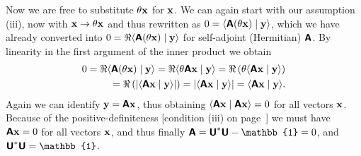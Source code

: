 {Now we are free to substitute  $\theta   {\bf x}$ for ${\bf x}$.
We can again start with our assumption (iii), now with  ${\bf x} \rightarrow \theta   {\bf x}$ and thus
rewritten as $0 =
\langle \textsf{\textbf{A}} (\theta   {\bf x}) \mid {\bf y} \rangle $, which we have already converted into
$0
=\Re  \langle \textsf{\textbf{A}} (\theta    {\bf x}) \mid {\bf y} \rangle$
for self-adjoint (Hermitian) $\textsf{\textbf{A}}$.
By linearity in the first argument of the inner product we obtain
\begin{equation}
\begin{split}
0
=\Re  \langle \textsf{\textbf{A}} (\theta    {\bf x}) \mid {\bf y} \rangle
=\Re  \langle  \theta  \textsf{\textbf{A}}   {\bf x}  \mid {\bf y} \rangle
=\Re   \left( \theta   \langle \textsf{\textbf{A}}   {\bf x} \mid {\bf y} \rangle      \right)  \\
=\Re \left( \vert \langle \textsf{\textbf{A}}   {\bf x} \mid {\bf y} \rangle    \vert  \right)
=  \vert \langle \textsf{\textbf{A}}   {\bf x} \mid {\bf y} \rangle    \vert
=   \langle \textsf{\textbf{A}}   {\bf x} \mid {\bf y} \rangle  .
\end{split}
\label{2016-m-ch-uniteq7}
\end{equation}
Again we can  identify ${\bf y} = \textsf{\textbf{A}} {\bf x}$, thus obtaining
$\langle \textsf{\textbf{A}} {\bf x} \mid \textsf{\textbf{A}} {\bf x}  \rangle  =0$
for all vectors ${\bf x}$.
Because of the positive-definiteness
[condition (iii) on page~\pageref{2016-m-ch-fdvs-pd}]
we must have $ \textsf{\textbf{A}} {\bf x}  =0$
for all vectors ${\bf x}$, and thus finally
$\textsf{\textbf{A}}= \textsf{\textbf{U}}^\ast\textsf{\textbf{U}} - \mathbb{1} =0$,
and $\textsf{\textbf{U}}^\ast\textsf{\textbf{U}} = \mathbb{1}$.


}
